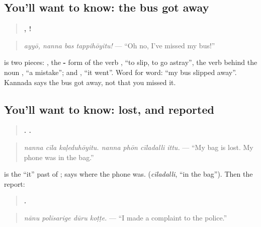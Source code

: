 \subsection*{You'll want to know: the bus got away}
\begin{quote}
\textbf{,   !}
\end{quote}

\begin{quote}
\emph{ayyō, nanna bas tappihōyitu!} — \textquotedblleft{}Oh no, I've missed my bus!\textquotedblright{}
\end{quote}

\textbf{} is two pieces: \textbf{}, the \textbf{-} form of the verb \textbf{}, \textquotedblleft{}to slip, to go astray\textquotedblright{}, the verb behind the noun \textbf{}, \textquotedblleft{}a mistake\textquotedblright{}; and \textbf{}, \textquotedblleft{}it went\textquotedblright{}. Word for word: \textquotedblleft{}my bus slipped away\textquotedblright{}. Kannada says the bus got away, not that you missed it.

\subsection*{You'll want to know: lost, and reported}
\begin{quote}
\textbf{  .    .}
\end{quote}

\begin{quote}
\emph{nanna cīla kaḷeduhōyitu. nanna phōn cīladalli ittu.} — \textquotedblleft{}My bag is lost. My phone was in the bag.\textquotedblright{}
\end{quote}

\textbf{} is the \textquotedblleft{}it\textquotedblright{} past of \textbf{}; \textbf{} says where the phone was. \textbf{} (\emph{cīladalli}, \textquotedblleft{}in the bag\textquotedblright{}). Then the report:

\begin{quote}
\textbf{   .}
\end{quote}

\begin{quote}
\emph{nānu polīsarige dūru koṭṭe.} — \textquotedblleft{}I made a complaint to the police.\textquotedblright{}
\end{quote}

